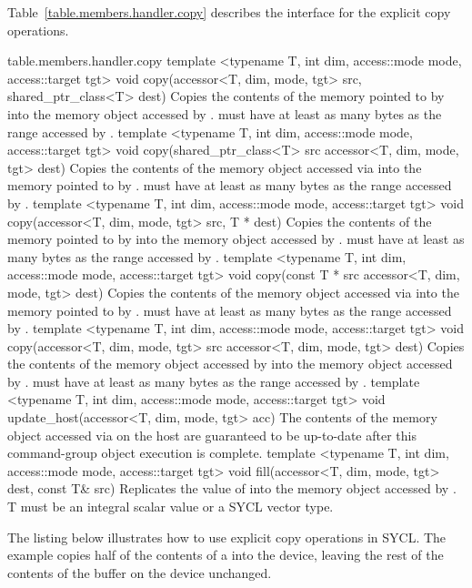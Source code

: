 Table~\ref{table.members.handler.copy} describes the interface for the 
explicit copy operations.

{table.members.handler.copy}
  \addRowThreeL
    {template <typename T, int dim, access::mode mode, access::target tgt>}
    {void copy(accessor<T, dim, mode, tgt> src,}
    { shared_ptr_class<T> dest)}
    { Copies the contents of the memory pointed to by  into the
      memory object accessed by .
       must have at least as many bytes as the 
      range accessed by .}
  \addRowThreeL
    {template <typename T, int dim, access::mode mode, access::target tgt>}
    {void copy(shared_ptr_class<T> src}
    { accessor<T, dim, mode, tgt> dest)}
    { Copies the contents of the memory object accessed via  
      into the memory pointed to by .
       must have at least as many bytes as the 
      range accessed by .}
  \addRowThreeL
    {template <typename T, int dim, access::mode mode, access::target tgt>}
    {void copy(accessor<T, dim, mode, tgt> src,}
    { T * dest)}
    { Copies the contents of the memory pointed to by  into the
      memory object accessed by .
       must have at least as many bytes as the 
      range accessed by .}
  \addRowThreeL
    {template <typename T, int dim, access::mode mode, access::target tgt>}
    {void copy(const T * src}
    { accessor<T, dim, mode, tgt> dest)}
    { Copies the contents of the memory object accessed via  
      into the memory pointed to by .
       must have at least as many bytes as the 
      range accessed by .}
  \addRowThreeL
    {template <typename T, int dim, access::mode mode, access::target tgt>}
    {void copy(accessor<T, dim, mode, tgt> src}
    { accessor<T, dim, mode, tgt> dest)}
    { Copies the contents of the memory object accessed by  
      into the memory object accessed by .
       must have at least as many bytes as the 
      range accessed by .}
  \addRowTwoL
    {template <typename T, int dim, access::mode mode, access::target tgt>}
    {void update_host(accessor<T, dim, mode, tgt> acc)}
    { The contents of the memory object accessed via  
      on the host are guaranteed to be up-to-date after this 
      \gls{command-group} object execution is complete.}
  \addRowThreeL
    {template <typename T, int dim, access::mode mode, access::target tgt>}
    {void fill(accessor<T, dim, mode, tgt> dest,}
    {          const T\& src)}
    {Replicates the value of  into the
      memory object accessed by .
      T must be an integral scalar value or a SYCL vector type.
    }

\completeTable

The listing below illustrates how to use explicit copy 
operations in SYCL. The example copies half of the contents of 
a  into the device, leaving the rest of the 
contents of the buffer on the device unchanged.



